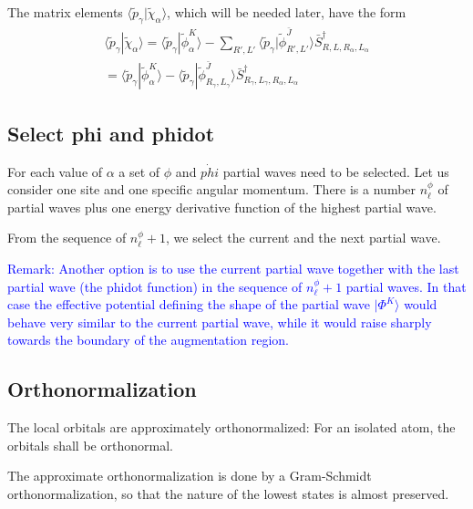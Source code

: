 \documentclass[11pt,a4paper]{report}
\begin{document}
The matrix elements
$\langle\tilde{p}_\gamma|\tilde{\chi}_\alpha\rangle$, which will be
needed later, have the form
\begin{eqnarray}
\langle\tilde{p}_\gamma|\tilde{\chi}_\alpha\rangle
=\langle\tilde{p}_\gamma|\tilde{\phi}^K_\alpha\rangle
-\sum_{R',L'}\langle\tilde{p}_\gamma|\tilde{\phi}^{\bar{J}}_{R',L'}\rangle
\bar{S}^\dagger_{R,L,R_\alpha,L_\alpha}
\nonumber\\
=\langle\tilde{p}_\gamma|\tilde{\phi}^K_\alpha\rangle
-\langle\tilde{p}_\gamma|\tilde{\phi}^{\bar{J}}_{R_\gamma,L_\gamma}\rangle
\bar{S}^\dagger_{R_\gamma,L_\gamma,R_\alpha,L_\alpha}
\end{eqnarray}

\subsection{Select phi and phidot}

For each value of $\alpha$ a set of $\phi$ and $\dot{phi}$ partial
waves need to be selected. Let us consider one site and one specific
angular momentum. There is a number $n^\phi_\ell$ of partial waves
plus one energy derivative function of the highest partial wave.

From the sequence of $n^\phi_\ell+1$, we select the current and the
next partial wave. 

\textcolor{blue}{Remark: Another option is to use the current partial
  wave together with the last partial wave (the phidot function) in
  the sequence of $n^\phi_\ell+1$ partial waves. In that case the
  effective potential defining the shape of the partial wave
  $|\Phi^K\rangle$ would behave very similar to the current partial
  wave, while it would raise sharply towards the boundary of the
  augmentation region.}

\subsection{Orthonormalization}
The local orbitals are approximately orthonormalized: For an isolated
atom, the orbitals shall be orthonormal.

The approximate orthonormalization is done by a Gram-Schmidt
orthonormalization, so that the nature of the lowest states is almost
preserved.
\end{document}
